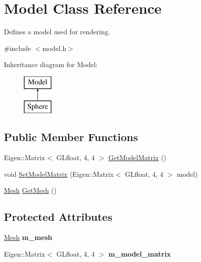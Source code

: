 \hypertarget{classModel}{}\section{Model Class Reference}
\label{classModel}


Defines a model used for rendering.  




{\ttfamily \#include $<$model.\+h$>$}

Inheritance diagram for Model\+:\begin{figure}[H]
\begin{center}
\leavevmode
\includegraphics[height=2.000000cm]{classModel}
\end{center}
\end{figure}
\subsection*{Public Member Functions}
\begin{DoxyCompactItemize}
\item 
Eigen\+::\+Matrix$<$ G\+Lfloat, 4, 4 $>$ \hyperlink{classModel_af37e550b25274838de666ddc7e2167d6}{Get\+Model\+Matrix} ()
\item 
void \hyperlink{classModel_a6b79c9e0c9abc50896e70fe1fabff4e7}{Set\+Model\+Matrix} (Eigen\+::\+Matrix$<$ G\+Lfloat, 4, 4 $>$ model)
\item 
\hyperlink{classMesh}{Mesh} \hyperlink{classModel_a332f5a4ecf9bca582e583b3ff7784bf5}{Get\+Mesh} ()
\end{DoxyCompactItemize}
\subsection*{Protected Attributes}
\begin{DoxyCompactItemize}
\item 
\mbox{\label{classModel_afe425f579d17b798e6c454a5c5e2d952}} 
\hyperlink{classMesh}{Mesh} {\bfseries m\+\_\+mesh}
\item 
\mbox{\label{classModel_a41d60873613f3b75c8242df3bbb44ca9}} 
Eigen\+::\+Matrix$<$ G\+Lfloat, 4, 4 $>$ {\bfseries m\+\_\+model\+\_\+matrix}
\end{DoxyCompactItemize}


